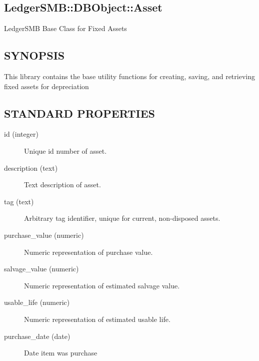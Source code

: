 \begin{description}
\begin{description}
\begin{description}
\begin{description}
\begin{description}
\begin{description}
\begin{description}
\begin{description}
\begin{description}
\section{LedgerSMB::DBObject::Asset\label{LedgerSMB::DBObject::Asset}}


LedgerSMB Base Class for Fixed Assets

\subsection*{SYNOPSIS\label{LedgerSMB::DBObject::Asset_SYNOPSIS}}


This library contains the base utility functions for creating, saving, and
retrieving fixed assets for depreciation

\subsection*{STANDARD PROPERTIES\label{LedgerSMB::DBObject::Asset_STANDARD_PROPERTIES}}
\begin{description}

\item[{id (integer)}] \mbox{}

Unique id number of asset.


\item[{description (text)}] \mbox{}

Text description of asset.


\item[{tag (text)}] \mbox{}

Arbitrary tag identifier, unique for current, non-disposed assets.


\item[{purchase\_value (numeric)}] \mbox{}

Numeric representation of purchase value.


\item[{salvage\_value (numeric)}] \mbox{}

Numeric representation of estimated salvage value.


\item[{usable\_life (numeric)}] \mbox{}

Numeric representation of estimated usable life.


\item[{purchase\_date (date)}] \mbox{}

Date item was purchase



\end{description}
\end{description}
\end{description}
\end{description}
\end{description}
\end{description}
\end{description}
\end{description}
\end{description}
\end{description}
